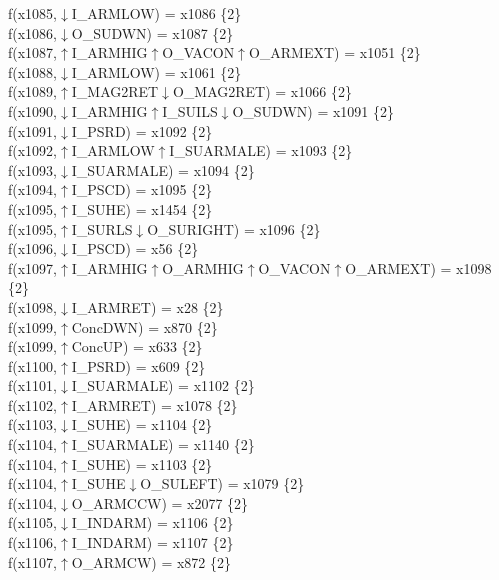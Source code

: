 f(x1085,$\downarrow$I\_ARMLOW) = x1086 \{2\} \\  
f(x1086,$\downarrow$O\_SUDWN) = x1087 \{2\} \\  
f(x1087,$\uparrow$I\_ARMHIG$\uparrow$O\_VACON$\uparrow$O\_ARMEXT) = x1051 \{2\} \\  
f(x1088,$\downarrow$I\_ARMLOW) = x1061 \{2\} \\  
f(x1089,$\uparrow$I\_MAG2RET$\downarrow$O\_MAG2RET) = x1066 \{2\} \\  
f(x1090,$\downarrow$I\_ARMHIG$\uparrow$I\_SUILS$\downarrow$O\_SUDWN) = x1091 \{2\} \\  
f(x1091,$\downarrow$I\_PSRD) = x1092 \{2\} \\  
f(x1092,$\uparrow$I\_ARMLOW$\uparrow$I\_SUARMALE) = x1093 \{2\} \\  
f(x1093,$\downarrow$I\_SUARMALE) = x1094 \{2\} \\  
f(x1094,$\uparrow$I\_PSCD) = x1095 \{2\} \\  
f(x1095,$\uparrow$I\_SUHE) = x1454 \{2\} \\  
f(x1095,$\uparrow$I\_SURLS$\downarrow$O\_SURIGHT) = x1096 \{2\} \\  
f(x1096,$\downarrow$I\_PSCD) = x56 \{2\} \\  
f(x1097,$\uparrow$I\_ARMHIG$\uparrow$O\_ARMHIG$\uparrow$O\_VACON$\uparrow$O\_ARMEXT) = x1098 \{2\} \\  
f(x1098,$\downarrow$I\_ARMRET) = x28 \{2\} \\  
f(x1099,$\uparrow$ConcDWN) = x870 \{2\} \\  
f(x1099,$\uparrow$ConcUP) = x633 \{2\} \\  
f(x1100,$\uparrow$I\_PSRD) = x609 \{2\} \\  
f(x1101,$\downarrow$I\_SUARMALE) = x1102 \{2\} \\  
f(x1102,$\uparrow$I\_ARMRET) = x1078 \{2\} \\  
f(x1103,$\downarrow$I\_SUHE) = x1104 \{2\} \\  
f(x1104,$\uparrow$I\_SUARMALE) = x1140 \{2\} \\  
f(x1104,$\uparrow$I\_SUHE) = x1103 \{2\} \\  
f(x1104,$\uparrow$I\_SUHE$\downarrow$O\_SULEFT) = x1079 \{2\} \\  
f(x1104,$\downarrow$O\_ARMCCW) = x2077 \{2\} \\  
f(x1105,$\downarrow$I\_INDARM) = x1106 \{2\} \\  
f(x1106,$\uparrow$I\_INDARM) = x1107 \{2\} \\  
f(x1107,$\uparrow$O\_ARMCW) = x872 \{2\} \\  
